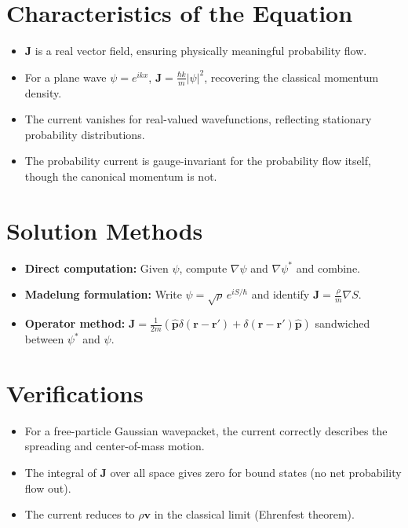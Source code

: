 \section*{Characteristics of the Equation}

\begin{itemize}
    \item $\mathbf{J}$ is a real vector field, ensuring physically meaningful probability flow.
    \item For a plane wave $\psi = e^{ikx}$, $\mathbf{J} = \frac{\hbar k}{m}|\psi|^2$, recovering the classical momentum density.
    \item The current vanishes for real-valued wavefunctions, reflecting stationary probability distributions.
    \item The probability current is gauge-invariant for the probability flow itself, though the canonical momentum is not.
\end{itemize}
\section*{Solution Methods}

\begin{itemize}
    \item \textbf{Direct computation:} Given $\psi$, compute $\nabla\psi$ and $\nabla\psi^*$ and combine.
    \item \textbf{Madelung formulation:} Write $\psi = \sqrt{\rho}\,e^{iS/\hbar}$ and identify $\mathbf{J} = \frac{\rho}{m}\nabla S$.
    \item \textbf{Operator method:} $\mathbf{J} = \frac{1}{2m}(\hat{\mathbf{p}}\delta(\mathbf{r}-\mathbf{r}') + \delta(\mathbf{r}-\mathbf{r}')\hat{\mathbf{p}})$ sandwiched between $\psi^*$ and $\psi$.
\end{itemize}
\section*{Verifications}

\begin{itemize}
    \item For a free-particle Gaussian wavepacket, the current correctly describes the spreading and center-of-mass motion.
    \item The integral of $\mathbf{J}$ over all space gives zero for bound states (no net probability flow out).
    \item The current reduces to $\rho \mathbf{v}$ in the classical limit (Ehrenfest theorem).
\end{itemize}
